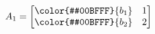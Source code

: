 \documentclass[preview]{standalone}
\begin{document}
\begin{align*}
A_1 = \begin{bmatrix} \color{#00BFFF}{b_1} & 1 \\ \color{#00BFFF}{b_2} & 2 \end{bmatrix}
\end{align*}
\end{document}
